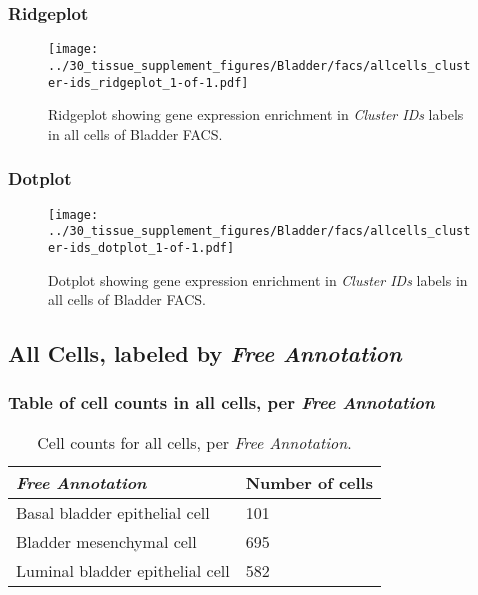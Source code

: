 \clearpage

\subsubsection{Ridgeplot}
\begin{figure}[h]
\centering
\texttt{[image: ../30\_tissue\_supplement\_figures/Bladder/facs/allcells\_cluster-ids\_ridgeplot\_1-of-1.pdf]}

\caption{ Ridgeplot  showing gene expression enrichment in \emph{Cluster IDs} labels in all cells of Bladder FACS. }
\end{figure}


\clearpage

\subsubsection{Dotplot}
\begin{figure}[h]
\centering
\texttt{[image: ../30\_tissue\_supplement\_figures/Bladder/facs/allcells\_cluster-ids\_dotplot\_1-of-1.pdf]}

\caption{ Dotplot  showing gene expression enrichment in \emph{Cluster IDs} labels in all cells of Bladder FACS. }
\end{figure}


\clearpage

\subsection{All Cells, labeled by \emph{Free Annotation}}
\subsubsection{Table of cell counts in all cells, per \emph{Free Annotation}}\begin{table}[h]
\centering
\label{my-label}
\begin{tabular}{@{}ll@{}}
\toprule

\emph{Free Annotation}& Number of cells \\ \midrule
Basal bladder epithelial cell & 101 \\

Bladder mesenchymal cell & 695 \\

Luminal bladder epithelial cell & 582 \\
\bottomrule
\end{tabular}
\caption{Cell counts for all cells, per \emph{Free Annotation}.}
\end{table}

